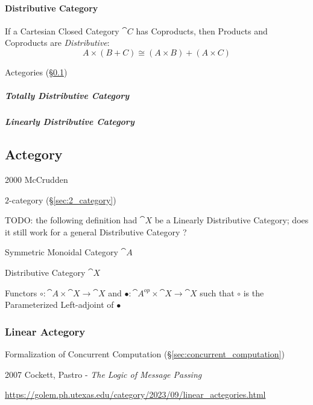 \paragraph{Distributive Category}\label{sec:distributive_category}\hfill

If a Cartesian Closed Category $\cat{C}$ has Coproducts, then
Products and Coproducts are \emph{Distributive}:\cite{awodey06}
\[
  A \times (B + C) \cong (A \times B) + (A \times C)
\]

Actegories (\S\ref{sec:actegory})



\subparagraph{Totally Distributive Category}
\label{sec:totally_distributive_category}\hfill

\subparagraph{Linearly Distributive Category}\label{sec:linearly_distributive}



\subsection{Actegory}\label{sec:actegory}

2000 McCrudden

$2$-category (\S\ref{sec:2_category})

TODO: the following definition had $\cat{X}$ be a Linearly Distributive
Category; does it still work for a general Distributive Category ?

Symmetric Monoidal Category $\cat{A}$

Distributive Category $\cat{X}$

Functors $\circ : \cat{A} \times \cat{X} \to \cat{X}$ and
$\bullet :  \cat{A}^{op} \times \cat{X} \to \cat{X}$ such that $\circ$ is the
Parameterized Left-adjoint of $\bullet$



\subsubsection{Linear Actegory}\label{sec:linear_actegory}

Formalization of Concurrent Computation (\S\ref{sec:concurrent_computation})

2007 Cockett, Pastro - \emph{The Logic of Message Passing}

\url{https://golem.ph.utexas.edu/category/2023/09/linear_actegories.html}




